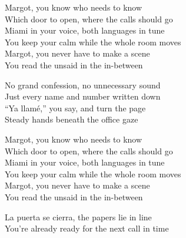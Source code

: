 \begin{lyrics}
Margot, you know who needs to know\\
Which door to open, where the calls should go\\
Miami in your voice, both languages in tune\\
You keep your calm while the whole room moves\\
Margot, you never have to make a scene\\
You read the unsaid in the in-between

No grand confession, no unnecessary sound\\
Just every name and number written down\\
“Ya llamé,” you say, and turn the page\\
Steady hands beneath the office gaze

Margot, you know who needs to know\\
Which door to open, where the calls should go\\
Miami in your voice, both languages in tune\\
You keep your calm while the whole room moves\\
Margot, you never have to make a scene\\
You read the unsaid in the in-between

La puerta se cierra, the papers lie in line\\
You’re already ready for the next call in time
\end{lyrics}

